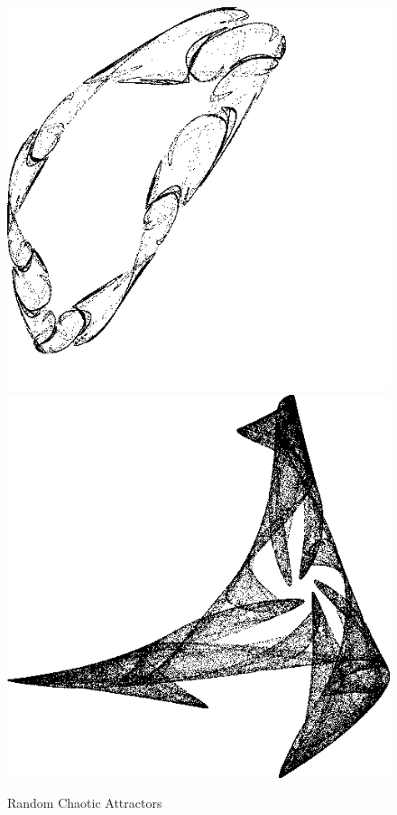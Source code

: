 \documentclass[12pt]{article}
\begin{document}
\begin{figure}[H]
    \includegraphics[width=0.47\linewidth]{Figures/random attractors/76507.png}
    \includegraphics[width=0.47\linewidth]{Figures/random attractors/78151.png}
    \caption{Random Chaotic Attractors}
    \label{fig:random chaotic attractors}
\end{figure}

\newpage
\end{document}
